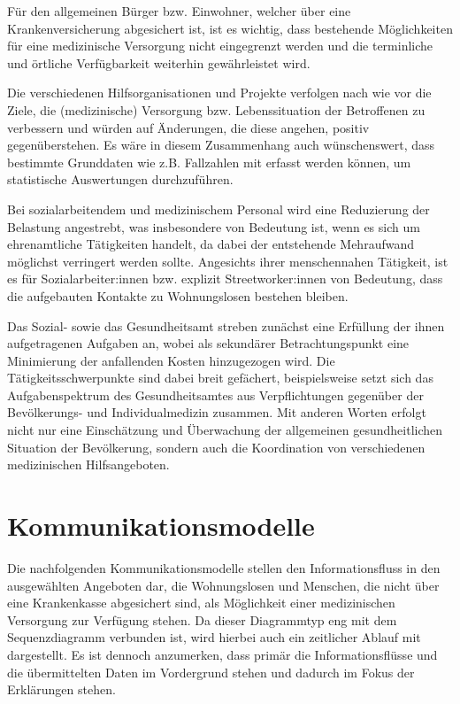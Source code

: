 Für den allgemeinen Bürger bzw. Einwohner, welcher über eine Krankenversicherung abgesichert ist, ist es wichtig, dass bestehende Möglichkeiten für eine medizinische Versorgung nicht eingegrenzt werden und die terminliche und örtliche Verfügbarkeit weiterhin gewährleistet wird.

Die verschiedenen Hilfsorganisationen und Projekte verfolgen nach wie vor die Ziele, die (medizinische) Versorgung bzw. Lebenssituation der Betroffenen zu verbessern und würden auf Änderungen, die diese angehen, positiv gegenüberstehen. Es wäre in diesem Zusammenhang auch wünschenswert, dass bestimmte Grunddaten wie z.B. Fallzahlen mit erfasst werden können, um statistische Auswertungen durchzuführen.

Bei sozialarbeitendem und medizinischem Personal wird eine Reduzierung der Belastung angestrebt, was insbesondere von Bedeutung ist, wenn es sich um ehrenamtliche Tätigkeiten handelt, da dabei der entstehende Mehraufwand möglichst verringert werden sollte. Angesichts ihrer menschennahen Tätigkeit, ist es für Sozialarbeiter:innen bzw. explizit Streetworker:innen von Bedeutung, dass die aufgebauten Kontakte zu Wohnungslosen bestehen bleiben.

Das Sozial- sowie das Gesundheitsamt streben zunächst eine Erfüllung der ihnen aufgetragenen Aufgaben an, wobei als sekundärer Betrachtungspunkt eine Minimierung der anfallenden Kosten hinzugezogen wird. Die Tätigkeitsschwerpunkte sind dabei breit gefächert, beispielsweise setzt sich das Aufgabenspektrum des Gesundheitsamtes aus Verpflichtungen gegenüber der Bevölkerungs- und Individualmedizin zusammen. Mit anderen Worten erfolgt nicht nur eine Einschätzung und Überwachung der allgemeinen gesundheitlichen Situation der Bevölkerung, sondern auch die Koordination von verschiedenen medizinischen Hilfsangeboten.


\section{Kommunikationsmodelle}\label{sec:com}

Die nachfolgenden Kommunikationsmodelle stellen den Informationsfluss in den ausgewählten Angeboten dar, die Wohnungslosen und Menschen, die nicht über eine Krankenkasse abgesichert sind, als Möglichkeit einer medizinischen Versorgung zur Verfügung stehen. Da dieser Diagrammtyp eng mit dem Sequenzdiagramm verbunden ist, wird hierbei auch ein zeitlicher Ablauf mit dargestellt. Es ist dennoch anzumerken, dass primär die Informationsflüsse und die übermittelten Daten im Vordergrund stehen und dadurch im Fokus der Erklärungen stehen.

